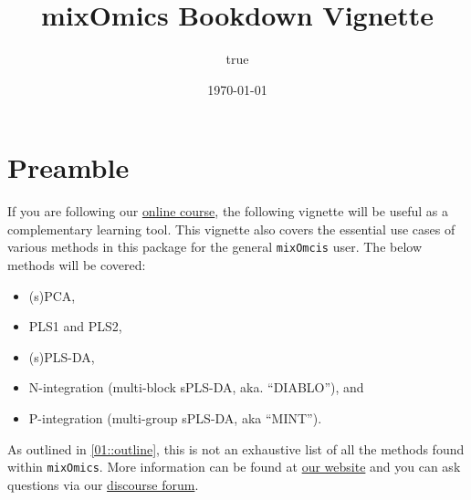 \documentclass[
]{book}
\title{mixOmics Bookdown Vignette}
\author{true}
\date{\today}
\providecommand{\tightlist}{%
  \setlength{\itemsep}{0pt}\setlength{\parskip}{0pt}}
\begin{document}
\maketitle

{
\setcounter{tocdepth}{1}
\tableofcontents
}
\hypertarget{preamble}{%
\chapter*{Preamble}\label{preamble}}

If you are following our \href{https://study.unimelb.edu.au/find/short-courses/mixomics-r-essentials-for-biological-data-integration/\#course-specifics}{online course}, the following vignette will be useful as a complementary learning tool. This vignette also covers the essential use cases of various methods in this package for the general \texttt{mixOmcis} user. The below methods will be covered:

\begin{itemize}
\tightlist
\item
  (s)PCA,
\item
  PLS1 and PLS2,
\item
  (s)PLS-DA,
\item
  N-integration (multi-block sPLS-DA, aka. ``DIABLO''), and
\item
  P-integration (multi-group sPLS-DA, aka ``MINT'').
\end{itemize}

As outlined in \ref{01::outline}, this is not an exhaustive list of all the methods found within \texttt{mixOmics}. More information can be found at \href{http://mixomics.org/}{our website} and you can ask questions via our \href{https://mixomics-users.discourse.group/}{discourse forum}.
\end{document}
